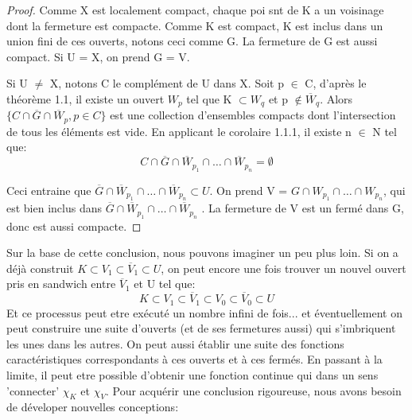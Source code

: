 \documentclass{article}
\begin{document}
\begin{proof}
     Comme X est localement compact, chaque poi snt de K a un voisinage dont la fermeture est compacte. Comme K est compact, K est inclus dans un union fini de ces ouverts, notons ceci comme G. La fermeture de G est aussi compact. Si U = X, on prend G = V.\par
     Si U $\neq$ X, notons C le complément de U dans X. Soit p $\in$ C, d'après le théorème 1.1, il existe un ouvert $W_{p}$ tel que K $\subset W_{q}$ et p $\notin \overline{W}_{q}$.
     Alors $\{C \cap \overline{G} \cap \overline{W}_{p}, p \in C \}$ est une collection d'ensembles compacts dont l'intersection de tous les éléments est vide. En applicant le corolaire 1.1.1, il existe n $\in$ N tel que: 
    \[C  \cap  \overline{G}  \cap \overline{W}_{p_{1}} \cap \dots \cap \overline{W}_{p_{n}}= \emptyset\]\par
    Ceci entraine que $\overline{G}  \cap \overline{W}_{p_{1}} \cap \dots \cap \overline{W}_{p_{n}} \subset U$. On prend V = $G  \cap W_{p_{1}} \cap \dots \cap {W}_{p_{n}}$, qui est bien inclus dans $\overline{G}  \cap \overline{W}_{p_{1}} \cap \dots \cap \overline{W}_{p_{n}}$ . La fermeture de V est un fermé dans G, donc est aussi compacte. 

\end{proof}

Sur la base de cette conclusion, nous pouvons imaginer un peu plus loin. Si on a déjà construit $K \subset V_{1} \subset \overline{V}_{1} \subset U$, on peut encore une fois trouver un nouvel ouvert pris en sandwich entre $\overline{V}_{1}$ et U tel que:
\[K \subset V_{1} \subset \overline{V}_{1} \subset V_{0} \subset \overline{V}_{0}\subset U\]
Et ce processus peut etre exécuté un nombre infini de fois... et éventuellement on peut construire une suite d'ouverts (et de ses fermetures aussi) qui s'imbriquent les unes dans les autres. On peut aussi établir une suite des fonctions caractéristiques correspondants à ces ouverts et à ces fermés. En passant à la limite, il peut etre possible d'obtenir une fonction continue qui dans un sens 'connecter' $\chi _{K}$ et $\chi _{V}$. Pour acquérir une conclusion rigoureuse, nous avons besoin de déveloper nouvelles conceptions: 
\end{document}
